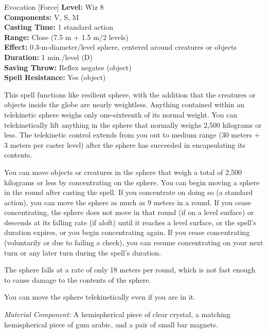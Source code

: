 {Evocation [Force]}
{
	\textbf{Level:}
	Wiz 8\\
	\textbf{Components:}
	V, S, M\\
	\textbf{Casting Time:}
	1 standard action\\
	\textbf{Range:}
	Close (7.5 m + 1.5 m/2 levels)\\
	\textbf{Effect:}
	0.3-m-diameter/level sphere, centered around creatures or objects\\
	\textbf{Duration:}
	1 min./level (D)\\
	\textbf{Saving Throw:}
	Reflex negates (object)\\
	\textbf{Spell Resistance:}
	Yes (object)\\
}
{
	This spell functions like resilient sphere, with the addition that the creatures or objects inside the globe are nearly weightless. Anything contained within an telekinetic sphere weighs only one-sixteenth of its normal weight. You can telekinetically lift anything in the sphere that normally weighs 2,500 kilograms or less. The telekinetic control extends from you out to medium range (30 meters + 3 meters per caster level) after the sphere has succeeded in encapsulating its contents.

	You can move objects or creatures in the sphere that weigh a total of 2,500 kilograms or less by concentrating on the sphere. You can begin moving a sphere in the round after casting the spell. If you concentrate on doing so (a standard action), you can move the sphere as much as 9 meters in a round. If you cease concentrating, the sphere does not move in that round (if on a level surface) or descends at its falling rate (if aloft) until it reaches a level surface, or the spell's duration expires, or you begin concentrating again. If you cease concentrating (voluntarily or due to failing a  check), you can resume concentrating on your next turn or any later turn during the spell's duration.

	The sphere falls at a rate of only 18 meters per round, which is not fast enough to cause damage to the contents of the sphere.

	You can move the sphere telekinetically even if you are in it.

	\textit{Material Component:}
	A hemispherical piece of clear crystal, a matching hemispherical piece of gum arabic, and a pair of small bar magnets.

}
